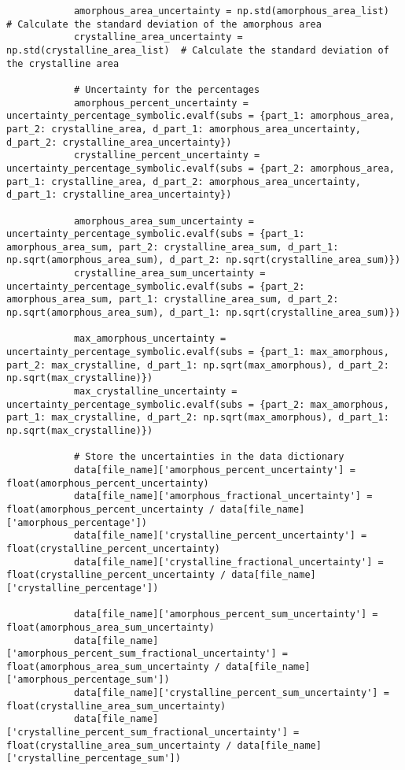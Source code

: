 \begin{lstlisting}
            amorphous_area_uncertainty = np.std(amorphous_area_list)  # Calculate the standard deviation of the amorphous area
            crystalline_area_uncertainty = np.std(crystalline_area_list)  # Calculate the standard deviation of the crystalline area

            # Uncertainty for the percentages
            amorphous_percent_uncertainty = uncertainty_percentage_symbolic.evalf(subs = {part_1: amorphous_area, part_2: crystalline_area, d_part_1: amorphous_area_uncertainty, d_part_2: crystalline_area_uncertainty})
            crystalline_percent_uncertainty = uncertainty_percentage_symbolic.evalf(subs = {part_2: amorphous_area, part_1: crystalline_area, d_part_2: amorphous_area_uncertainty, d_part_1: crystalline_area_uncertainty})

            amorphous_area_sum_uncertainty = uncertainty_percentage_symbolic.evalf(subs = {part_1: amorphous_area_sum, part_2: crystalline_area_sum, d_part_1: np.sqrt(amorphous_area_sum), d_part_2: np.sqrt(crystalline_area_sum)})
            crystalline_area_sum_uncertainty = uncertainty_percentage_symbolic.evalf(subs = {part_2: amorphous_area_sum, part_1: crystalline_area_sum, d_part_2: np.sqrt(amorphous_area_sum), d_part_1: np.sqrt(crystalline_area_sum)})

            max_amorphous_uncertainty = uncertainty_percentage_symbolic.evalf(subs = {part_1: max_amorphous, part_2: max_crystalline, d_part_1: np.sqrt(max_amorphous), d_part_2: np.sqrt(max_crystalline)})
            max_crystalline_uncertainty = uncertainty_percentage_symbolic.evalf(subs = {part_2: max_amorphous, part_1: max_crystalline, d_part_2: np.sqrt(max_amorphous), d_part_1: np.sqrt(max_crystalline)})

            # Store the uncertainties in the data dictionary
            data[file_name]['amorphous_percent_uncertainty'] = float(amorphous_percent_uncertainty)
            data[file_name]['amorphous_fractional_uncertainty'] = float(amorphous_percent_uncertainty / data[file_name]['amorphous_percentage'])
            data[file_name]['crystalline_percent_uncertainty'] = float(crystalline_percent_uncertainty)
            data[file_name]['crystalline_fractional_uncertainty'] = float(crystalline_percent_uncertainty / data[file_name]['crystalline_percentage'])

            data[file_name]['amorphous_percent_sum_uncertainty'] = float(amorphous_area_sum_uncertainty)
            data[file_name]['amorphous_percent_sum_fractional_uncertainty'] = float(amorphous_area_sum_uncertainty / data[file_name]['amorphous_percentage_sum'])
            data[file_name]['crystalline_percent_sum_uncertainty'] = float(crystalline_area_sum_uncertainty)
            data[file_name]['crystalline_percent_sum_fractional_uncertainty'] = float(crystalline_area_sum_uncertainty / data[file_name]['crystalline_percentage_sum'])


\end{lstlisting}
